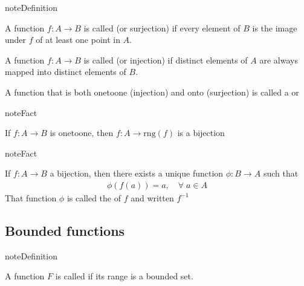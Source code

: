 \documentclass[letterpaper,10pt,english]{jupyterBook}
\begin{document}
\begin{sphinxadmonition}{note}{Definition}

\sphinxAtStartPar
A function \(f \colon A \to B\) is called  (or surjection) if every element of \(B\)
is the image under \(f\) of at least one point in \(A\).

\sphinxAtStartPar
A function \(f \colon A \to B\) is called  (or injection) if distinct
elements of \(A\) are always mapped into distinct elements of \(B\).

\sphinxAtStartPar
A function that is both one\sphinxhyphen{}to\sphinxhyphen{}one (injection) and onto (surjection) is called a  or 
\end{sphinxadmonition}

\begin{sphinxadmonition}{note}{Fact}

\sphinxAtStartPar
If \(f \colon A \to B\) is one\sphinxhyphen{}to\sphinxhyphen{}one, then \(f \colon A \to \mathrm{rng}(f)\) is a bijection
\end{sphinxadmonition}

\begin{sphinxadmonition}{note}{Fact}

\sphinxAtStartPar
If \(f \colon A \to B\) a bijection, then there exists a unique
function \(\phi \colon B \to A\) such that
\begin{equation*}
\begin{split}
%
\phi(f(a)) = a, \quad \forall \; a \in A
%
\end{split}
\end{equation*}
\sphinxAtStartPar
That function \(\phi\) is called the  of \(f\) and written \(f^{-1}\)
\end{sphinxadmonition}

\begin{figure}[htbp]
\centering

\noindent{}
\end{figure}


\subsection{Bounded functions}
\label{\detokenize{06.optimization_fundamentals:bounded-functions}}
\begin{sphinxadmonition}{note}{Definition}

\sphinxAtStartPar
A function \(F\) is called  if its range is a bounded set.
\end{sphinxadmonition}
\end{document}
